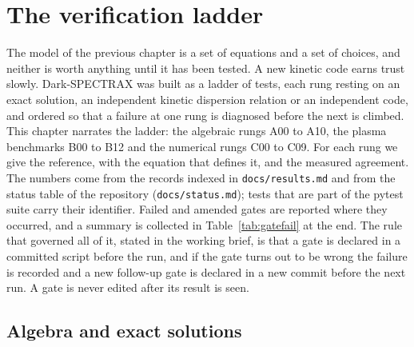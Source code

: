 \chapter{The verification ladder}\label{ch:verification}

The model of the previous chapter is a set of equations and a set of choices, and neither is worth anything until it has been tested. A new kinetic code earns trust slowly. Dark-SPECTRAX was built as a ladder of tests, each rung resting on an exact solution, an independent kinetic dispersion relation or an independent code, and ordered so that a failure at one rung is diagnosed before the next is climbed. This chapter narrates the ladder: the algebraic rungs A00 to A10, the plasma benchmarks B00 to B12 and the numerical rungs C00 to C09. For each rung we give the reference, with the equation that defines it, and the measured agreement. The numbers come from the records indexed in \texttt{docs/results.md} and from the status table of the repository (\texttt{docs/status.md}); tests that are part of the pytest suite carry their identifier. Failed and amended gates are reported where they occurred, and a summary is collected in Table~\ref{tab:gatefail} at the end. The rule that governed all of it, stated in the working brief, is that a gate is declared in a committed script before the run, and if the gate turns out to be wrong the failure is recorded and a new follow-up gate is declared in a new commit before the next run. A gate is never edited after its result is seen.

\section{Algebra and exact solutions}\label{sec:algebra}

